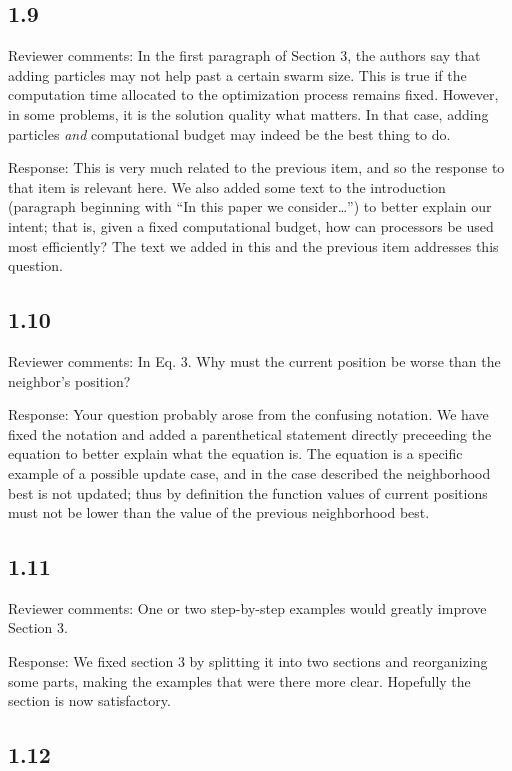 \documentclass[onecolumn, 12pt]{article}
\begin{document}
\subsection*{1.9}

Reviewer comments: In the first paragraph of Section 3, the authors say that
adding particles may not help past a certain swarm size. This is true if the
computation time allocated to the optimization process remains fixed. However,
in some problems, it is the solution quality what matters. In that case, adding
particles \emph{and} computational budget may indeed be the best thing to do.

Response: This is very much related to the previous item, and so the response
to that item is relevant here.  We also added some text to the introduction
(paragraph beginning with ``In this paper we consider\ldots'') to better
explain our intent; that is, given a fixed computational budget, how can
processors be used most efficiently?  The text we added in this and the
previous item addresses this question.

\subsection*{1.10}

Reviewer comments: In Eq. 3. Why must the current position be worse than the
neighbor's position?

Response: Your question probably arose from the confusing notation.  We have
fixed the notation and added a parenthetical statement directly preceeding the
equation to better explain what the equation is.  The equation is a specific
example of a possible update case, and in the case described the neighborhood
best is not updated; thus by definition the function values of current
positions must not be lower than the value of the previous neighborhood best.

\subsection*{1.11}

Reviewer comments: One or two step-by-step examples would greatly improve
Section 3.

Response: We fixed section 3 by splitting it into two sections and reorganizing
some parts, making the examples that were there more clear.  Hopefully the
section is now satisfactory.

\subsection*{1.12}
\end{document}
